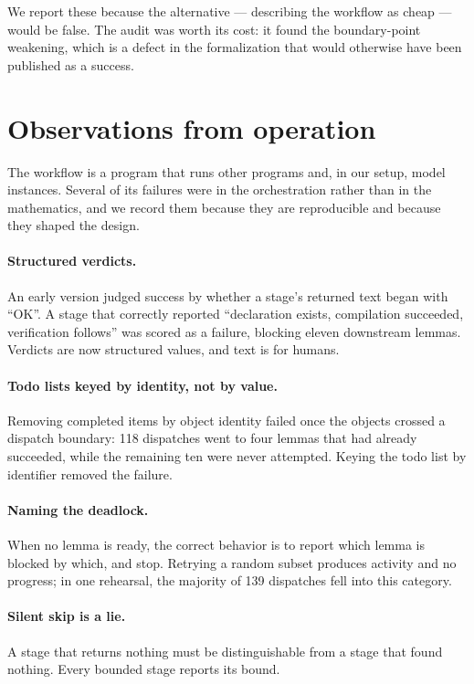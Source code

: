 \documentclass[11pt]{article}
\begin{document}
We report these because the alternative --- describing the workflow as cheap
--- would be false. The audit was worth its cost: it found the boundary-point
weakening, which is a defect in the formalization that would otherwise have
been published as a success.

\section{Observations from operation}

The workflow is a program that runs other programs and, in our setup, model
instances. Several of its failures were in the orchestration rather than in
the mathematics, and we record them because they are reproducible and because
they shaped the design.

\paragraph{Structured verdicts.} An early version judged success by whether a
stage's returned text began with ``OK''. A stage that correctly reported
``declaration exists, compilation succeeded, verification follows'' was scored
as a failure, blocking eleven downstream lemmas. Verdicts are now structured
values, and text is for humans.

\paragraph{Todo lists keyed by identity, not by value.} Removing completed
items by object identity failed once the objects crossed a dispatch boundary:
118 dispatches went to four lemmas that had already succeeded, while the
remaining ten were never attempted. Keying the todo list by identifier removed
the failure.

\paragraph{Naming the deadlock.} When no lemma is ready, the correct behavior
is to report which lemma is blocked by which, and stop. Retrying a random
subset produces activity and no progress; in one rehearsal, the majority of
139 dispatches fell into this category.

\paragraph{Silent skip is a lie.} A stage that returns nothing must be
distinguishable from a stage that found nothing. Every bounded stage reports
its bound.
\end{document}
